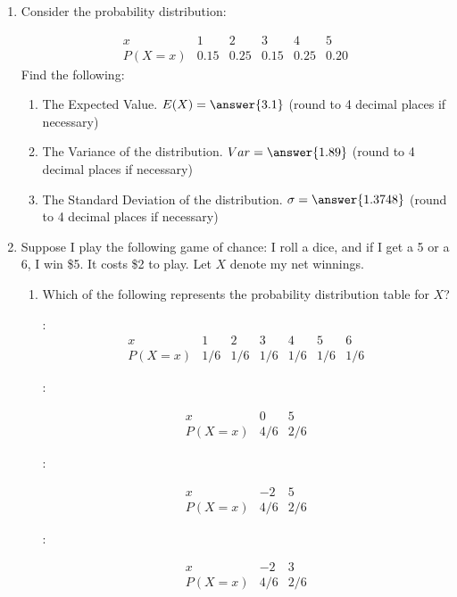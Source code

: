 \documentclass{ximera}
\begin{document}
\begin{enumerate}
\begin{selectAll}
\end{selectAll}


\item  Consider the probability distribution:

$$\begin{array}{c|ccccc}
x & 1 & 2 &  3 & 4 & 5\\
\hline
P(X=x) & 0.15 & 0.25  & 0.15 & 0.25 & 0.20
\end{array}$$
Find the following:

\begin{enumerate}
\item The Expected Value.  $E(X)=\answer{3.1}$ (round to 4 decimal places if necessary)
\item The Variance of the distribution.  $Var=\answer{1.89}$ (round to 4 decimal places if necessary)
\item The Standard Deviation of the distribution. $\sigma=\answer{1.3748}$  (round to 4 decimal places if necessary)
\end{enumerate}

\item Suppose I play the following game of chance:  I roll a dice, and if I get a 5 or a 6, I win \$5.  It costs \$2 to play.  Let $X$ denote my net winnings.

\begin{enumerate}
\item Which of the following represents the probability distribution table for $X$?

\begin{multipleChoice}
\choice:  
$$\begin{array}{c|cccccc}
x & 1 & 2 &  3 & 4 & 5 & 6\\
\hline
P(X=x) & 1/6 & 1/6  & 1/6 & 1/6 & 1/6 & 1/6
\end{array}$$

\choice:

$$\begin{array}{c|cc}
x & 0 & 5 \\
\hline
P(X=x) & 4/6 & 2/6  
\end{array}$$

\choice:

$$\begin{array}{c|cc}
x & -2 & 5 \\
\hline
P(X=x) & 4/6 & 2/6  
\end{array}$$

\choice[correct]:

$$\begin{array}{c|cc}
x & -2 & 3 \\
\hline
P(X=x) & 4/6 & 2/6  
\end{array}$$




\end{multipleChoice}
\end{enumerate}
\end{enumerate}
\end{document}
